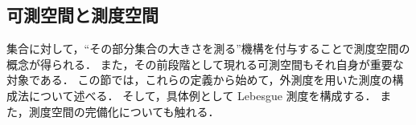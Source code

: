 \subsection{可測空間と測度空間}

集合に対して，``その部分集合の大きさを測る''機構を付与することで測度空間の概念が得られる．
また，その前段階として現れる可測空間もそれ自身が重要な対象である．
この節では，これらの定義から始めて，外測度を用いた測度の構成法について述べる．
そして，具体例として Lebesgue 測度を構成する．
また，測度空間の完備化についても触れる．



